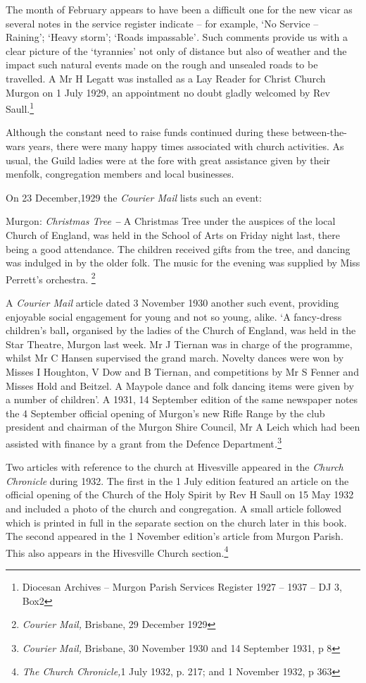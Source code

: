The month of February appears to have been a difficult one for the new
vicar as several notes in the service register indicate -- for example,
`No Service -- Raining'; `Heavy storm'; `Roads impassable'\emph{.} Such
comments provide us with a clear picture of the `tyrannies' not only of
distance but also of weather and the impact such natural events made on
the rough and unsealed roads to be travelled. A Mr H Legatt was
installed as a Lay Reader for Christ Church Murgon on 1 July 1929, an
appointment no doubt gladly welcomed by Rev Saull.\footnote{Diocesan
  Archives -- Murgon Parish Services Register 1927 -- 1937 -- DJ 3, Box2}

Although the constant need to raise funds continued during these
between-the-wars years, there were many happy times associated with
church activities. As usual, the Guild ladies were at the fore with
great assistance given by their menfolk, congregation members and local
businesses.

On 23 December,1929 the \emph{Courier Mail} lists such an event:

Murgon: \emph{Christmas Tree \textbf{-- }}A Christmas Tree under the
auspices of the local Church of England, was held in the School of Arts
on Friday night last, there being a good attendance. The children
received gifts from the tree, and dancing was indulged in by the older
folk. The music for the evening was supplied by Miss Perrett's
orchestra. \footnote{\emph{Courier Mail,} Brisbane, 29 December 1929}

A \emph{Courier Mail} article dated 3 November 1930 another such event,
providing enjoyable social engagement for young and not so young, alike.
`A fancy-dress children's ball\emph{\textbf{,}} organised by the ladies
of the Church of England, was held in the Star Theatre, Murgon last
week. Mr J Tiernan was in charge of the programme, whilst Mr C Hansen
supervised the grand march. Novelty dances were won by Misses I
Houghton, V Dow and B Tiernan, and competitions by Mr S Fenner and
Misses Hold and Beitzel. A Maypole dance and folk dancing items were
given by a number of children'. A 1931, 14 September edition of the same
newspaper notes the 4 September official opening of Murgon's new Rifle
Range by the club president and chairman of the Murgon Shire Council, Mr
A Leich which had been assisted with finance by a grant from the Defence
Department\emph{.}\footnote{\emph{Courier Mail,} Brisbane, 30 November
  1930 and 14 September 1931, p 8}

Two articles with reference to the church at Hivesville appeared in the
\emph{Church Chronicle} during 1932. The first in the 1 July edition
featured an article on the official opening of the Church of the Holy
Spirit by Rev H Saull on 15 May 1932 and included a photo of the church
and congregation. A small article followed which is printed in full in
the separate section on the church later in this book. The second
appeared in the 1 November edition's article from Murgon Parish. This
also appears in the Hivesville Church section.\footnote{\emph{The Church
  Chronicle,}1 July 1932, p. 217; and 1 November 1932, p 363}

